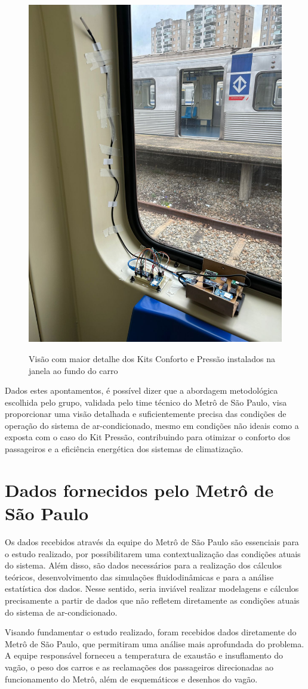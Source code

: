 \documentclass[acronym,symbols,table]{fei}
\begin{document}
\begin{figure}[!htb]
\centering
    \caption{Visão com maior detalhe dos Kits Conforto e Pressão instalados na janela ao fundo do carro}
    \includegraphics[width=0.50\linewidth]{Imagens/kitjanelazoom.jpeg}
    \label{fig:kitjanelazoom}
\end{figure}

Dados estes apontamentos, é possível dizer que a abordagem metodológica escolhida pelo grupo, validada pelo time técnico do Metrô de São Paulo, visa proporcionar uma visão detalhada e suficientemente precisa das condições de operação do sistema de ar-condicionado, mesmo em condições não ideais como a exposta com o caso do Kit Pressão, contribuindo para otimizar o conforto dos passageiros e a eficiência energética dos sistemas de climatização. 

\section{Dados fornecidos pelo Metrô de São Paulo}

Os dados recebidos através da equipe do Metrô de São Paulo são essenciais para o estudo realizado, por possibilitarem uma contextualização das condições atuais do sistema. Além disso, são dados necessários para a realização dos cálculos teóricos, desenvolvimento das simulações fluidodinâmicas e para a análise estatística dos dados. Nesse sentido, seria inviável realizar modelagens e cálculos precisamente a partir de dados que não refletem diretamente as condições atuais do sistema de ar-condicionado.

Visando fundamentar o estudo realizado, foram recebidos dados diretamente do Metrô de São Paulo, que permitiram uma análise mais aprofundada do problema. A equipe responsável forneceu a temperatura de exaustão e insuflamento do vagão, o peso dos carros e as reclamações dos passageiros direcionadas ao funcionamento do Metrô, além de esquemáticos e desenhos do vagão. 
\end{document}
